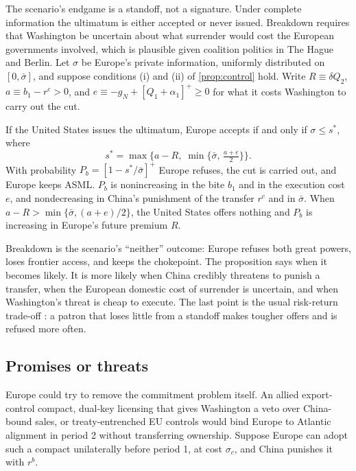 The scenario's endgame is a standoff, not a signature. Under complete information the ultimatum is either accepted or never issued. Breakdown requires that Washington be uncertain about what surrender would cost the European governments involved, which is plausible given coalition politics in The Hague and Berlin. Let $\sigma$ be Europe's private information, uniformly distributed on $[0,\bar\sigma]$, and suppose conditions (i) and (ii) of \cref{prop:control} hold. Write $R \equiv \delta Q_2$, $a \equiv b_1 - r^c > 0$, and $e \equiv -g_N + [Q_1 + \alpha_1]^+ \geq 0$ for what it costs Washington to carry out the cut.

\begin{proposition}[Breakdown]\label{prop:breakdown}
If the United States issues the ultimatum, Europe accepts if and only if $\sigma \leq s^*$, where
\begin{equation}\label{eq:sstar}
s^* = \max\Big\{a - R,\; \min\big\{\bar\sigma,\, \tfrac{a+e}{2}\big\}\Big\}.
\end{equation}
With probability $P_b = [1 - s^*/\bar\sigma]^+$ Europe refuses, the cut is carried out, and Europe keeps ASML. $P_b$ is nonincreasing in the bite $b_1$ and in the execution cost $e$, and nondecreasing in China's punishment of the transfer $r^c$ and in $\bar\sigma$. When $a - R > \min\{\bar\sigma, (a+e)/2\}$, the United States offers nothing and $P_b$ is increasing in Europe's future premium $R$.
\end{proposition}

Breakdown is the scenario's ``neither'' outcome: Europe refuses both great powers, loses frontier access, and keeps the chokepoint. The proposition says when it becomes likely. It is more likely when China credibly threatens to punish a transfer, when the European domestic cost of surrender is uncertain, and when Washington's threat is cheap to execute. The last point is the usual risk-return trade-off \citep{fearon1995rationalist, powell1999shadow}: a patron that loses little from a standoff makes tougher offers and is refused more often.

\subsection{Promises or threats}

Europe could try to remove the commitment problem itself. An allied export-control compact, dual-key licensing that gives Washington a veto over China-bound sales, or treaty-entrenched EU controls would bind Europe to Atlantic alignment in period 2 without transferring ownership. Suppose Europe can adopt such a compact unilaterally before period 1, at cost $\sigma_c$, and China punishes it with $r^b$.

